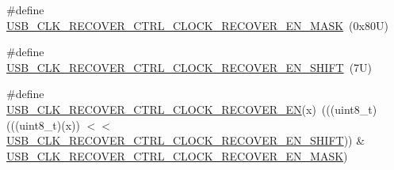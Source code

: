 \begin{DoxyCompactItemize}
\item 
\#define \mbox{\hyperlink{group___u_s_b___register___masks_gafea91b9d1976f9212d7caf1ae1d6e20d}{U\+S\+B\+\_\+\+C\+L\+K\+\_\+\+R\+E\+C\+O\+V\+E\+R\+\_\+\+C\+T\+R\+L\+\_\+\+C\+L\+O\+C\+K\+\_\+\+R\+E\+C\+O\+V\+E\+R\+\_\+\+E\+N\+\_\+\+M\+A\+SK}}~(0x80\+U)
\item 
\#define \mbox{\hyperlink{group___u_s_b___register___masks_ga0be4a3f8e9d2306f64ebe6b47216524d}{U\+S\+B\+\_\+\+C\+L\+K\+\_\+\+R\+E\+C\+O\+V\+E\+R\+\_\+\+C\+T\+R\+L\+\_\+\+C\+L\+O\+C\+K\+\_\+\+R\+E\+C\+O\+V\+E\+R\+\_\+\+E\+N\+\_\+\+S\+H\+I\+FT}}~(7\+U)
\item 
\#define \mbox{\hyperlink{group___u_s_b___register___masks_gab2e71afbcf36a633273539e09cac475e}{U\+S\+B\+\_\+\+C\+L\+K\+\_\+\+R\+E\+C\+O\+V\+E\+R\+\_\+\+C\+T\+R\+L\+\_\+\+C\+L\+O\+C\+K\+\_\+\+R\+E\+C\+O\+V\+E\+R\+\_\+\+EN}}(x)~(((uint8\+\_\+t)(((uint8\+\_\+t)(x)) $<$$<$ \mbox{\hyperlink{group___u_s_b___register___masks_ga0be4a3f8e9d2306f64ebe6b47216524d}{U\+S\+B\+\_\+\+C\+L\+K\+\_\+\+R\+E\+C\+O\+V\+E\+R\+\_\+\+C\+T\+R\+L\+\_\+\+C\+L\+O\+C\+K\+\_\+\+R\+E\+C\+O\+V\+E\+R\+\_\+\+E\+N\+\_\+\+S\+H\+I\+FT}})) \& \mbox{\hyperlink{group___u_s_b___register___masks_gafea91b9d1976f9212d7caf1ae1d6e20d}{U\+S\+B\+\_\+\+C\+L\+K\+\_\+\+R\+E\+C\+O\+V\+E\+R\+\_\+\+C\+T\+R\+L\+\_\+\+C\+L\+O\+C\+K\+\_\+\+R\+E\+C\+O\+V\+E\+R\+\_\+\+E\+N\+\_\+\+M\+A\+SK}})
\end{DoxyCompactItemize}
